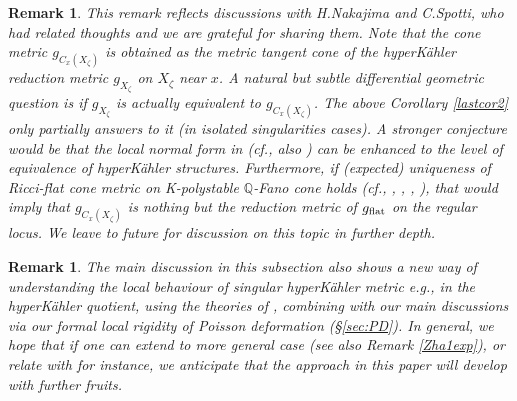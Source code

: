 \documentclass[12pt,a4paper]{amsart}
\newtheorem{Rem}[Thm]{Remark}
\theoremstyle{remark}
\newtheorem{ex}[Thm]{Example}
\theoremstyle{definition}
\def\R{\mathbb{R}}
\def\Q{\mathbb{Q}}
\begin{document}
\begin{Rem}
This remark reflects 
discussions with H.Nakajima and C.Spotti, who had related thoughts 
and we are grateful for sharing them. 
Note that 
the cone metric $g_{C_x(X_{\zeta})}$ is obtained as the 
metric tangent cone of the hyperK\"ahler reduction metric 
$g_{X_\zeta}$ 
on $X_\zeta$ near 
$x$. A natural but subtle differential geometric 
question is if 
$g_{X_\zeta}$ is actually equivalent to $g_{C_x(X_{\zeta})}$. 
The above Corollary \eqref{lastcor2} only partially answers to it 
(in isolated singularities cases). 
A stronger conjecture would be that 
the local normal form in \cite[1.4(iv)]{May} 
(cf., also \cite[4.4]{NakajimaTakayama}) 
can be enhanced to the level of equivalence of 
hyperK\"ahler structures. 
Furthermore, if (expected) uniqueness of Ricci-flat cone metric on 
K-polystable $\Q$-Fano cone holds (cf., \cite{BandoMabuchi}, 
\cite{CS2}, \cite[\S 4.4]{HanLi}, \cite[2.9]{Linotes}), that 
would imply that  $g_{C_x(X_\zeta)}$ is nothing but the 
reduction metric of $g_{\rm flat}$ on the regular locus. 
We leave to future for discussion on this topic in further depth. 
\end{Rem}

\begin{Rem}
The main discussion in this subsection also 
shows a new way of understanding 
the local behaviour of singular hyperK\"ahler metric e.g.,  
in the hyperK\"ahler quotient, using the theories 
of \cite{DSII, ChiuSzek, Zha24}, combining with 
our main discussions via our formal local rigidity 
of Poisson deformation (\S \ref{sec:PD}). 
In general, we hope that if one can extend \cite{DSII, ChiuSzek, Zha24} 
to more general case 
(see also Remark \ref{Zha1exp}), or relate with \cite{Od24c} for instance, 
we anticipate that the approach in this paper will develop with further 
fruits. 
\end{Rem}
\end{document}
